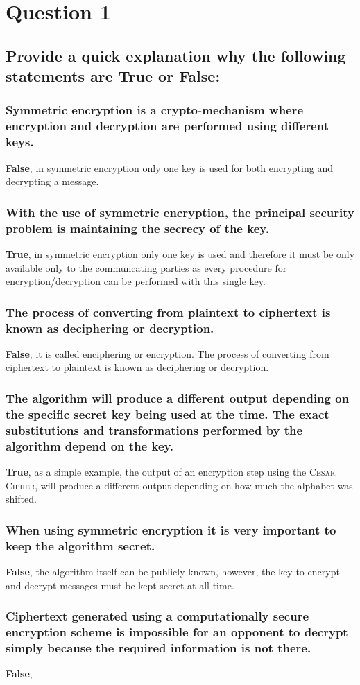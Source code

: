 \documentclass{report}
\begin{document}
	\section{Question 1}
	\startsection
		\renewcommand{\thesubsection}{\thesection.\Alph{subsection}}
		\subsection{Provide a quick explanation why the following statements are True or False:}
		\startsubsection
			\subsubsection{Symmetric encryption is a crypto-mechanism where encryption and decryption are performed using different keys.}
			\startsubsection
				\textbf{False}, in symmetric encryption only one key is used for both encrypting and decrypting a message.
			\closesection
			\subsubsection{With the use of symmetric encryption, the principal security problem is maintaining the secrecy of the key.}
			\startsubsection
				\textbf{True}, in symmetric encryption only one key is used and therefore it must be only available only to the communcating parties as every procedure for encryption/decryption can be performed with this single key.
			\closesection
			\subsubsection{The process of converting from plaintext to ciphertext is known as deciphering or decryption.}
			\startsubsection
				\textbf{False}, it is called enciphering or encryption. The process of converting from ciphertext to plaintext is known as deciphering or decryption.
			\closesection
			\subsubsection{The algorithm will produce a different output depending on the specific secret key being used at the time. The exact substitutions and transformations performed by the algorithm depend on the key.}
			\startsubsection
				\textbf{True}, as a simple example, the output of an encryption step using the \textsc{Cesar Cipher}, will produce a different output depending on how much the alphabet was shifted.
			\closesection
			\subsubsection{When using symmetric encryption it is very important to keep the algorithm secret.}
			\startsubsection
				\textbf{False}, the algorithm itself can be publicly known, however, the key to encrypt and decrypt messages must be kept secret at all time.
			\closesection
			\subsubsection{Ciphertext generated using a computationally secure encryption scheme is impossible for an opponent to decrypt simply because the required information is not there.}
			\startsubsection
				\textbf{False}, 
			\closesection
		\closesection
	\closesection
\end{document}

